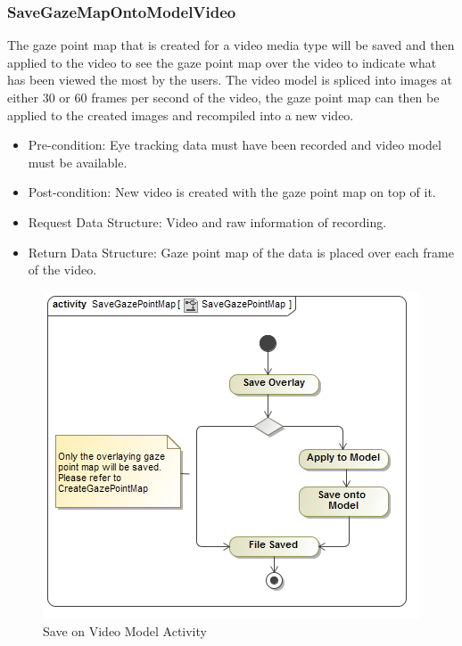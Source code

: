 	\subsubsection{SaveGazeMapOntoModelVideo}
	The gaze point map that is created for a video media type will be saved and then applied to the video to see the gaze point map over the video to indicate what has been viewed the most by the users. The video model is spliced into images at either 30 or 60 frames per second of the video, the gaze point map can then be applied to the created images and recompiled into a new video.
	\begin{itemize}
		\item Pre-condition: Eye tracking data must have been recorded and video model must be available.
		\item Post-condition: New video is created with the gaze point map on top of it.
		\item Request Data Structure: Video and raw information of recording.
		\item Return Data Structure: Gaze point map of the data is placed over each frame of the video.
	\end{itemize}
	\begin{figure}[!ht]
		\centering	
		\includegraphics[scale=0.5]{Diagrams/Activity_Diagram__SaveGazePointMap__SaveGazePointMap.png}	
		\caption{Save on Video Model Activity}
	\end{figure}

